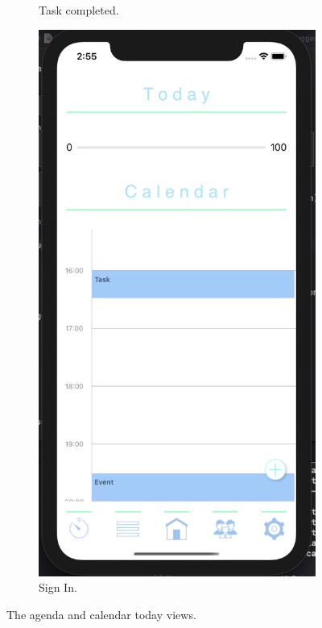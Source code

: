 \begin{figure}[H]
\begin{subfigure}[b]{0.3\textwidth}
        \caption{Task completed.}
        \label{fig:agenda_today_complete_app}
    \end{subfigure}
    \hfill
    \begin{subfigure}[b]{0.3\textwidth}
        \centering
        \includegraphics[width=\textwidth]{./graphics/Implementation/Dashboard/calendar today populated.png}
        \caption{Sign In.}
        \label{fig:calendar_today_app}
    \end{subfigure}
    
    \caption{The agenda and calendar today views.}
    \label{fig:agenda_calendar_today_app}
\end{figure}